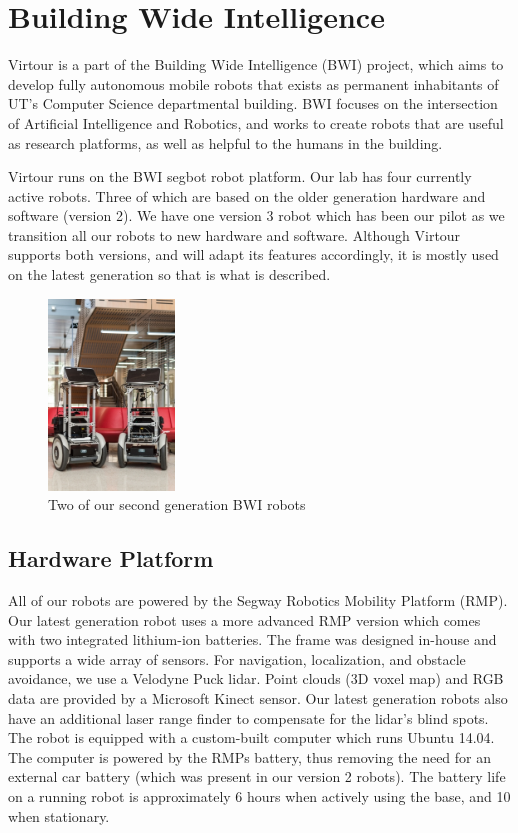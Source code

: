 \documentclass[
  oneside,
  11pt, a4paper,
  footinclude=true,
  headinclude=true,
  cleardoublepage=empty
]{article}
\begin{document}
\section{Building Wide Intelligence}

Virtour is a part of the Building Wide Intelligence (BWI) project, which aims
to develop fully autonomous mobile robots that exists as permanent inhabitants
of UT's Computer Science departmental building. BWI focuses on the intersection
of Artificial Intelligence and Robotics, and works to create robots that are
useful as research platforms, as well as helpful to the humans in the building.

Virtour runs on the BWI segbot robot platform. Our lab has four currently
active robots. Three of which are based on the older generation hardware and
software (version 2). We have one version 3 robot which has been our pilot as
we transition all our robots to new hardware and software. Although Virtour
supports both versions, and will adapt its features accordingly, it is mostly
used on the latest generation so that is what is described.

\begin{figure}
\centering
\includegraphics[height=2in]{bwi}
\caption{Two of our second generation BWI robots}
\end{figure}

\subsection{Hardware Platform}

All of our robots are powered by the Segway Robotics Mobility Platform (RMP).
Our latest generation robot uses a more advanced RMP version which comes with
two integrated lithium-ion batteries. The frame was designed in-house and
supports a wide array of sensors. For navigation, localization, and obstacle
avoidance, we use a Velodyne Puck lidar. Point clouds (3D voxel map) and RGB
data are provided by a Microsoft Kinect sensor. Our latest generation robots
also have an additional laser range finder to compensate for the lidar's blind
spots. The robot is equipped with a custom-built computer which runs Ubuntu
14.04. The computer is powered by the RMPs battery, thus removing the need for
an external car battery (which was present in our version 2 robots).  The
battery life on a running robot is approximately 6 hours when actively using
the base, and 10 when stationary.
\end{document}
